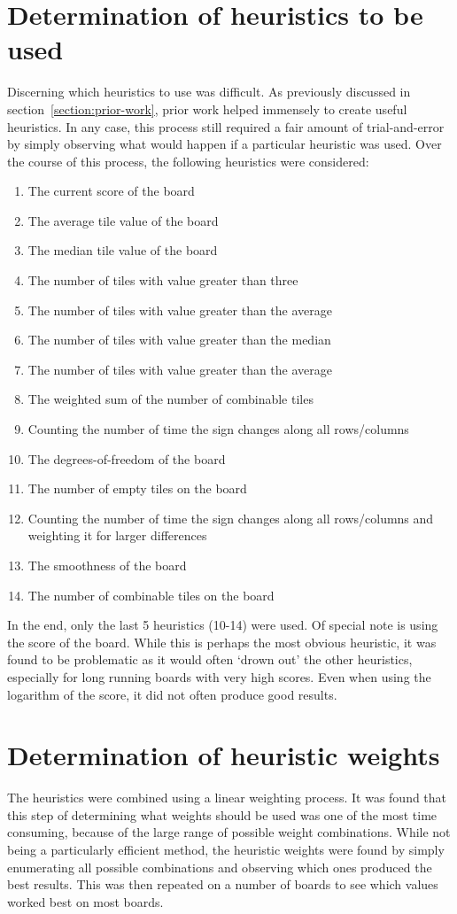 \documentclass[a4paper, 11pt, titlepage]{report}
\begin{document}
\section{Determination of heuristics to be used}
Discerning which heuristics to use was difficult. As previously discussed in section~\ref{section:prior-work}, prior work helped immensely to create useful heuristics. In any case, this process still required a fair amount of trial-and-error by simply observing what would happen if a particular heuristic was used. Over the course of this process, the following heuristics were considered:
\begin{enumerate}
	\singlespacing
	\item The current score of the board
	\item The average tile value of the board
	\item The median tile value of the board
	\item The number of tiles with value greater than three
	\item The number of tiles with value greater than the average
	\item The number of tiles with value greater than the median
	\item The number of tiles with value greater than the average
	\item The weighted sum of the number of combinable tiles
	\item Counting the number of time the sign changes along all rows/columns
	\item The degrees-of-freedom of the board
	\item The number of empty tiles on the board
	\item Counting the number of time the sign changes along all rows/columns and weighting it for larger differences
	\item The smoothness of the board
	\item The number of combinable tiles on the board
	\onehalfspacing
\end{enumerate}

In the end, only the last 5 heuristics (10-14) were used. Of special note is using the score of the board. While this is perhaps the most obvious heuristic, it was found to be problematic as it would often `drown out' the other heuristics, especially for long running boards with very high scores. Even when using the logarithm of the score, it did not often produce good results.

\section{Determination of heuristic weights}
The heuristics were combined using a linear weighting process. It was found that this step of determining what weights should be used was one of the most time consuming, because of the large range of possible weight combinations. While not being a particularly efficient method, the heuristic weights were found by simply enumerating all possible combinations and observing which ones produced the best results. This was then repeated on a number of boards to see which values worked best on most boards.
\end{document}
